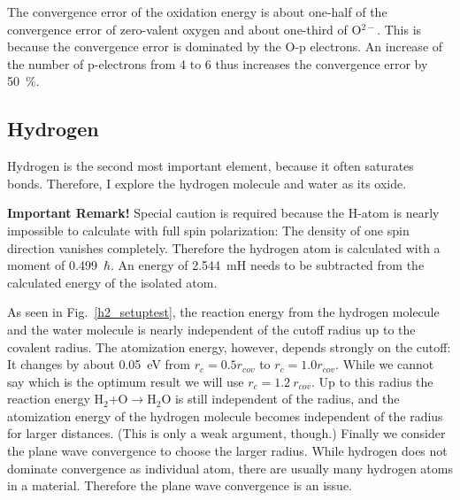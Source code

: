 \documentclass[11pt,a4paper]{report}
\begin{document}
The convergence error of the oxidation energy is about one-half of the
convergence error of zero-valent oxygen and about one-third of
O$^{2-}$. This is because the convergence error is dominated by the
O-p electrons. An increase of the number of p-electrons from 4 to 6
thus increases the convergence error by 50~\%.



\subsection{Hydrogen}
Hydrogen is the second most important element, because it often
saturates bonds. Therefore, I explore the hydrogen molecule and water
as its oxide.

\textbf{Important Remark!} Special caution is required because the
H-atom is nearly impossible to calculate with full spin polarization:
The density of one spin direction vanishes completely. Therefore the
hydrogen atom is calculated with a moment of 0.499~$\hbar$. An energy
of 2.544~mH needs to be subtracted from the calculated energy of the
isolated atom.

As seen in Fig.~\ref{h2_setuptest}, the reaction energy from the
hydrogen molecule and the water molecule is nearly independent of the
cutoff radius up to the covalent radius. The atomization energy,
however, depends strongly on the cutoff: It changes by about 0.05~eV
from $r_c=0.5 r_{cov}$ to $r_c=1.0 r_{cov}$. While we cannot say which
is the optimum result we will use $r_c=1.2~r_{cov}$. Up to this radius
the reaction energy H$_2$+O$\rightarrow$H$_2$O is still independent of
the radius, and the atomization energy of the hydrogen molecule
becomes independent of the radius for larger distances. (This is only
a weak argument, though.) Finally we consider the plane wave
convergence to choose the larger radius. While hydrogen does not
dominate convergence as individual atom, there are usually many
hydrogen atoms in a material. Therefore the plane wave convergence is
an issue.
\end{document}
